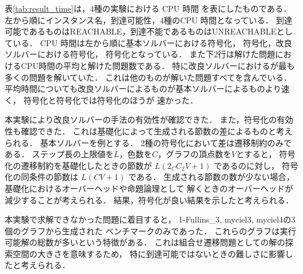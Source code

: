 表\ref{tab:result_time}は，4種の実験における CPU 時間
を表にしたものである．
左から順にインスタンス名，到達可能性，4種のCPU 時間となっている．
到達可能であるものはREACHABLE，到達不能であるものはUNREACHABLEとしている．
CPU 時間は左から順に基本ソルバーにおける符号化，
符号化，改良ソルバーにおける符号化，
符号化となっている．
また下2行は解けた問題におけるCPU時間の平均と解けた問題数である．
特に改良ソルバーにおけるが最も多くの問題を解いていた．
これは他のものが解いた問題すべてを含んでいる．
平均時間についても改良ソルバーによるものが基本ソルバーによるものより速く，
符号化と符号化では符号化のほうが
速かった．

本実験により改良ソルバーの手法の有効性が確認できた．
また，符号化の有効性も確認できた．
これは基礎化によって生成される節数の差によるものと考えられる．
基本ソルバーを例とする．
2種の符号化において差は遷移制約のみである．
ステップ長の上限値を$L$，色数を$C$，グラフの頂点数を$V$とすると，
符号化の遷移制約を基礎化したときの節数が
$L(2 {}_{C}C_{2} V + 1)$
であるのに対し，
符号化の同条件の節数は
$L(CV + 1)$
である．
生成される節数の数が少ない場合，
基礎化におけるオーバーヘッドや命題論理として
解くときのオーバーヘッドが減少することが考えられる．
結果，符号化が良い結果を示したと考えられる．

本実験で求解できなかった問題に着目すると，
1-Fullins\_3, myciel3, myciel4の3個のグラフから生成された
ベンチマークのみであった．
これらのグラフは実行可能解の総数が多いという特徴がある．
これは組合せ遷移問題としての解の探索空間の大きさを意味するため，
特に到達可能ではないときの難しさに影響したと考えられる．

